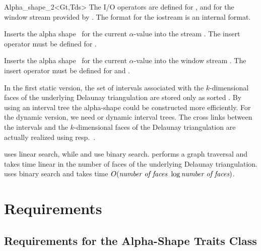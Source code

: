 \begin{ccClassTemplate} {Alpha_shape_2<Gt,Tds>}
The I/O operators are defined for , and for
the window stream provided by \cgal. The format for the iostream
is an internal format. 


{Inserts the alpha shape \ccVar\ for the current $\alpha$-value into the stream .
\ccPrecond The insert operator must be defined for .}


{Inserts the alpha shape \ccVar\ for the current $\alpha$-value into the window stream .
\ccPrecond The insert operator must be defined for  and .}
\end{ccClassTemplate}

\ccImplementation
In the first static version, the set of intervals associated with the
$k$-dimensional faces of the underlying Delaunay triangulation are
stored only as sorted . By using an interval tree the
alpha-shape could be constructed more efficiently. For the dynamic
version, we need  or dynamic interval trees. The
cross links between the intervals and the $k$-dimensional faces of the
Delaunay triangulation are actually realized using
 resp.\ .

 uses linear search, while 
 and  
use binary search.
 performs a graph traversal and takes time linear in the number of faces of the underlying Delaunay triangulation.
 uses binary search and takes time
$O(\mbox{\em number of faces } \log{\mbox{\em number of faces}})$.


\section{Requirements\label{I1_SectRequirements}}


\subsection{Requirements for the Alpha-Shape Traits Class} 

